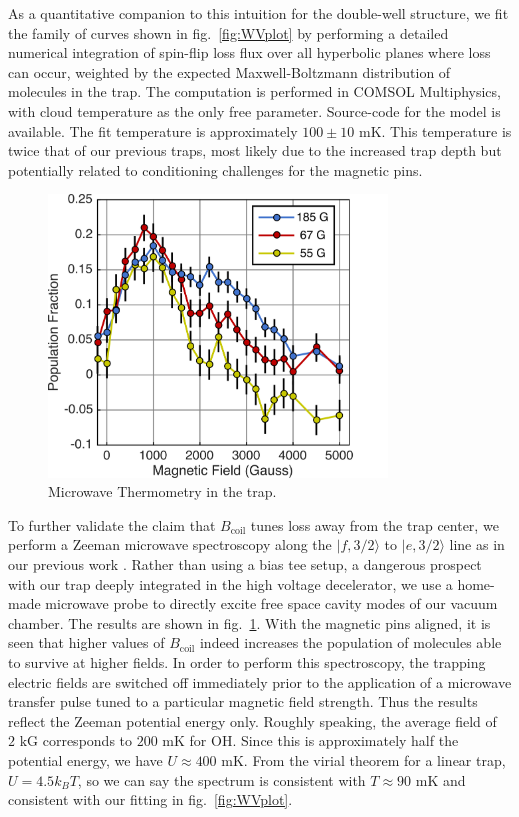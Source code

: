 \documentclass[%
 reprint,
 amsmath,amssymb,
 aps,
prl,
]{revtex4-1}
\begin{document}
As a quantitative companion to this intuition for the double-well structure, we fit the family of curves shown in fig.~\ref{fig:WVplot} by performing a detailed numerical integration of spin-flip loss flux over all hyperbolic planes where loss can occur, weighted by the expected Maxwell-Boltzmann distribution of molecules in the trap. The computation is performed in COMSOL Multiphysics, with cloud temperature as the only free parameter. Source-code for the model is available.\cite{githubCOMcode} The fit temperature is approximately $100\pm10\text{ mK}$. This temperature is twice that of our previous traps, most likely due to the increased trap depth but potentially related to conditioning challenges for the magnetic pins.

\begin{figure}
\includegraphics[width=90mm]{MWSpec/MW-therm-dave.png}%
\caption{
Microwave Thermometry in the trap.
\label{fig:spec}}
\end{figure}

To further validate the claim that $B_\text{coil}$ tunes loss away from the trap center, we perform a Zeeman microwave spectroscopy along the $|f,3/2\rangle$ to $|e,3/2\rangle$ line as in our previous work \cite{stuhl2012evap}. Rather than using a bias tee setup, a dangerous prospect with our trap deeply integrated in the high voltage decelerator, we use a home-made microwave probe to directly excite free space cavity modes of our vacuum chamber. The results are shown in fig.~\ref{fig:spec}. With the magnetic pins aligned, it is seen that higher values of $B_{\text{coil}}$ indeed increases the population of molecules able to survive at higher fields. In order to perform this spectroscopy, the trapping electric fields are switched off immediately prior to the application of a microwave transfer pulse tuned to a particular magnetic field strength. Thus the results reflect the Zeeman potential energy only. Roughly speaking, the average field of $2\text{ kG}$ corresponds to $200\text{ mK}$ for OH. Since this is approximately half the potential energy, we have $U\approx400\text{ mK}$. From the virial theorem for a linear trap, $U = 4.5k_BT$, so we can say the spectrum is consistent with $T\approx 90\text{ mK}$ and consistent with our fitting in fig.~\ref{fig:WVplot}.
\end{document}
